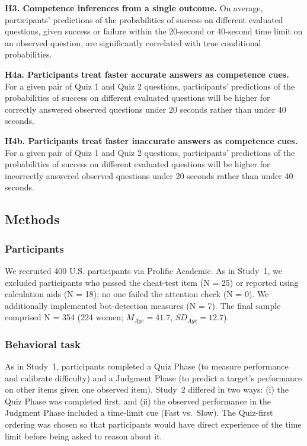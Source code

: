 \documentclass[10pt,letterpaper]{article}
\begin{document}
\textbf{H3. Competence inferences from a single outcome.} On average, participants' predictions of the probabilities of success on different evaluated questions, given success or failure within the 20-second or 40-second time limit on an observed question, are significantly correlated with true conditional probabilities.

\textbf{H4a. Participants treat faster accurate answers as competence cues.} For a given pair of Quiz 1 and Quiz 2 questions, participants’ predictions of the probabilities of success on different evaluated questions will be higher for correctly answered observed questions under 20 seconds rather than under 40 seconds.

\textbf{H4b. Participants treat faster inaccurate answers as competence cues.} For a given pair of Quiz 1 and Quiz 2 questions, participants’ predictions of the probabilities of success on different evaluated questions will be higher for incorrectly answered observed questions under 20 seconds rather than under 40 seconds.

\subsection{Methods}\label{methods-2}

\subsubsection{Participants}\label{participants-2}

We recruited 400 U.S. participants via Prolific Academic. As in Study~1, we excluded participants who passed the cheat-test item (N = 25) or reported using calculation aids (N = 18); no one failed the attention check (N = 0). We additionally implemented bot-detection measures (N = 7). The final sample comprised N = 354 (224 women; \(M_{Age}=41.7\), \(SD_{Age}=12.7\)).

\subsubsection{Behavioral task}\label{behavioral-task-2}

As in Study~1, participants completed a Quiz Phase (to measure performance and calibrate difficulty) and a Judgment Phase (to predict a target’s performance on other items given one observed item). Study~2 differed in two ways: (i) the Quiz Phase was completed first, and (ii) the observed performance in the Judgment Phase included a time-limit cue (Fast vs.\ Slow). The Quiz-first ordering was chosen so that participants would have direct experience of the time limit before being asked to reason about it.
\end{document}
